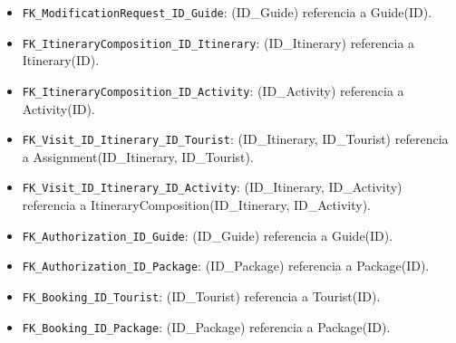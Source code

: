 \documentclass[11pt,a4paper]{article}
\begin{document}
\begin{itemize}[leftmargin=1.2em,itemsep=2pt,topsep=3pt]
\item \texttt{FK\_\allowbreak{}ModificationRequest\_\allowbreak{}ID\_\allowbreak{}Guide}: (ID\_Guide) referencia a Guide(ID).
\item \texttt{FK\_\allowbreak{}ItineraryComposition\_\allowbreak{}ID\_\allowbreak{}Itinerary}: (ID\_Itinerary) referencia a Itinerary(ID).
\item \texttt{FK\_\allowbreak{}ItineraryComposition\_\allowbreak{}ID\_\allowbreak{}Activity}: (ID\_Activity) referencia a Activity(ID).
\item \texttt{FK\_\allowbreak{}Visit\_\allowbreak{}ID\_\allowbreak{}Itinerary\_\allowbreak{}ID\_\allowbreak{}Tourist}: (ID\_Itinerary, ID\_Tourist) referencia a Assignment(ID\_Itinerary, ID\_Tourist).
\item \texttt{FK\_\allowbreak{}Visit\_\allowbreak{}ID\_\allowbreak{}Itinerary\_\allowbreak{}ID\_\allowbreak{}Activity}: (ID\_Itinerary, ID\_Activity) referencia a ItineraryComposition(ID\_Itinerary, ID\_Activity).
\item \texttt{FK\_\allowbreak{}Authorization\_\allowbreak{}ID\_\allowbreak{}Guide}: (ID\_Guide) referencia a Guide(ID).
\item \texttt{FK\_\allowbreak{}Authorization\_\allowbreak{}ID\_\allowbreak{}Package}: (ID\_Package) referencia a Package(ID).
\item \texttt{FK\_\allowbreak{}Booking\_\allowbreak{}ID\_\allowbreak{}Tourist}: (ID\_Tourist) referencia a Tourist(ID).
\item \texttt{FK\_\allowbreak{}Booking\_\allowbreak{}ID\_\allowbreak{}Package}: (ID\_Package) referencia a Package(ID).
\end{itemize}
\end{document}
